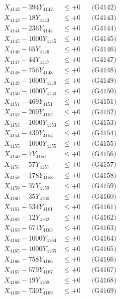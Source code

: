 \documentclass[a4paper,10pt]{article}
\begin{document}
{\begin{align}
X_{4142} - 394Y_{4142} &\leq +0 && \text{(G4142)} \\
X_{4143} - 18Y_{4143} &\leq +0 && \text{(G4143)} \\
X_{4144} - 236Y_{4144} &\leq +0 && \text{(G4144)} \\
X_{4145} - 1000Y_{4145} &\leq +0 && \text{(G4145)} \\
X_{4146} - 65Y_{4146} &\leq +0 && \text{(G4146)} \\
X_{4147} - 44Y_{4147} &\leq +0 && \text{(G4147)} \\
X_{4148} - 756Y_{4148} &\leq +0 && \text{(G4148)} \\
X_{4149} - 1000Y_{4149} &\leq +0 && \text{(G4149)} \\
X_{4150} - 1000Y_{4150} &\leq +0 && \text{(G4150)} \\
\allowbreak
X_{4151} - 469Y_{4151} &\leq +0 && \text{(G4151)} \\
X_{4152} - 209Y_{4152} &\leq +0 && \text{(G4152)} \\
X_{4153} - 1000Y_{4153} &\leq +0 && \text{(G4153)} \\
X_{4154} - 439Y_{4154} &\leq +0 && \text{(G4154)} \\
X_{4155} - 1000Y_{4155} &\leq +0 && \text{(G4155)} \\
X_{4156} - 7Y_{4156} &\leq +0 && \text{(G4156)} \\
X_{4157} - 57Y_{4157} &\leq +0 && \text{(G4157)} \\
X_{4158} - 178Y_{4158} &\leq +0 && \text{(G4158)} \\
X_{4159} - 37Y_{4159} &\leq +0 && \text{(G4159)} \\
X_{4160} - 35Y_{4160} &\leq +0 && \text{(G4160)} \\
\allowbreak
X_{4161} - 534Y_{4161} &\leq +0 && \text{(G4161)} \\
X_{4162} - 12Y_{4162} &\leq +0 && \text{(G4162)} \\
X_{4163} - 671Y_{4163} &\leq +0 && \text{(G4163)} \\
X_{4164} - 1000Y_{4164} &\leq +0 && \text{(G4164)} \\
X_{4165} - 1000Y_{4165} &\leq +0 && \text{(G4165)} \\
X_{4166} - 758Y_{4166} &\leq +0 && \text{(G4166)} \\
X_{4167} - 679Y_{4167} &\leq +0 && \text{(G4167)} \\
X_{4168} - 19Y_{4168} &\leq +0 && \text{(G4168)} \\
X_{4169} - 730Y_{4169} &\leq +0 && \text{(G4169)} \\

\end{align}}
\end{document}
